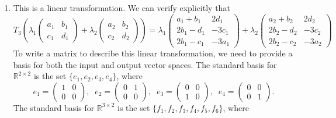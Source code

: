 \documentclass[11pt]{article}
\begin{document}
\begin{enumerate}
\item This is a linear transformation. We can verify explicitly that
$$ T_3\left(\lambda_1 \begin{pmatrix} a_1 & b_1 \\ c_1 & d_1 \end{pmatrix} + \lambda_2 \begin{pmatrix} a_2 & b_2 \\ c_2 & d_2 \end{pmatrix} \right) 
              = \lambda_1 \begin{pmatrix} a_1+b_1 & 2d_1 \\ 2b_1-d_1 & -3c_1 \\ 2b_1-c_1 & -3a_1 \end{pmatrix} + \lambda_2 \begin{pmatrix} a_2+b_2 & 2d_2 \\ 2b_2-d_2 & -3c_2 \\ 2b_2-c_2 & -3a_2 \end{pmatrix} $$
To write a matrix to describe this linear transformation, we need to provide a basis for both the input and output vector spaces. The standard basis for $\mathbb{R}^{2\times2}$ is the set $\{e_1,e_2,e_3,e_4\}$, where
$$e_1 = \begin{pmatrix} 1 & 0 \\ 0 & 0 \end{pmatrix}, \;\; e_2  = \begin{pmatrix} 0 & 1 \\ 0 & 0 \end{pmatrix}, \;\; e_3 = \begin{pmatrix} 0 & 0 \\  1& 0 \end{pmatrix}, \;\; e_4 = \begin{pmatrix} 0 & 0 \\ 0 & 1 \end{pmatrix}.$$
The standard basis for $\mathbb{R}^{3\times2}$ is the set $\{f_1,f_2,f_3,f_4,f_5,f_6\}$, where

\end{enumerate}
\end{document}
